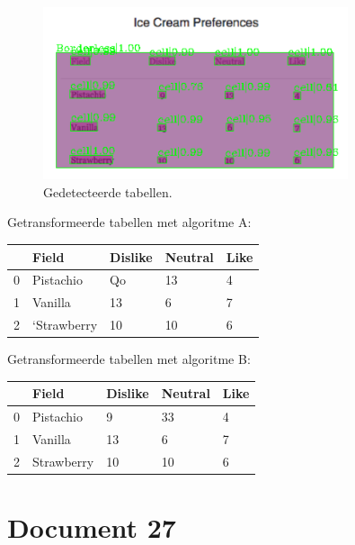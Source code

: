 \begin{figure}[H]
    \centering
    \includegraphics[width=0.8\textwidth]{test-resultaten/26/detected_tables.png}
    \caption{Gedetecteerde tabellen.}
\end{figure}

Getransformeerde tabellen met algoritme A:

\begin{tabular}{lllll}
\toprule
{} &        Field & Dislike & Neutral & Like \\
\midrule
0 &    Pistachio &      Qo &      13 &    4 \\
1 &      Vanilla &      13 &       6 &    7 \\
2 &  ‘Strawberry &      10 &      10 &    6 \\
\bottomrule
\end{tabular}

Getransformeerde tabellen met algoritme B:

\begin{tabular}{lllll}
\toprule
{} &       Field & Dislike & Neutral & Like \\
\midrule
0 &   Pistachio &       9 &      33 &    4 \\
1 &     Vanilla &      13 &       6 &    7 \\
2 &  Strawberry &      10 &      10 &    6 \\
\bottomrule
\end{tabular}
\section{Document 27}

